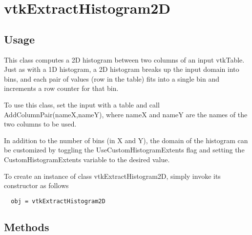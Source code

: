 \section{vtkExtractHistogram2D}

\subsection{Usage}

  This class computes a 2D histogram between two columns of an input
  vtkTable. Just as with a 1D histogram, a 2D histogram breaks 
  up the input domain into bins, and each pair of values (row in
  the table) fits into a single bin and increments a row counter
  for that bin.
  
  To use this class, set the input with a table and call AddColumnPair(nameX,nameY),
  where nameX and nameY are the names of the two columns to be used.

  In addition to the number of bins (in X and Y), the domain of
  the histogram can be customized by toggling the UseCustomHistogramExtents
  flag and setting the CustomHistogramExtents variable to the 
  desired value.


To create an instance of class vtkExtractHistogram2D, simply
invoke its constructor as follows
\begin{verbatim}
  obj = vtkExtractHistogram2D
\end{verbatim}
\subsection{Methods}

